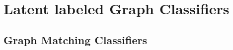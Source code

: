 \documentclass[10pt,journal,cspaper,compsoc]{IEEEtran}
\begin{document}
% 
% 




\section{Latent labeled Graph Classifiers} %
\label{sec:algorithms}

\subsection{Graph Matching Classifiers} %
\label{sec:quadratic_assignment_problem}
\end{document}
